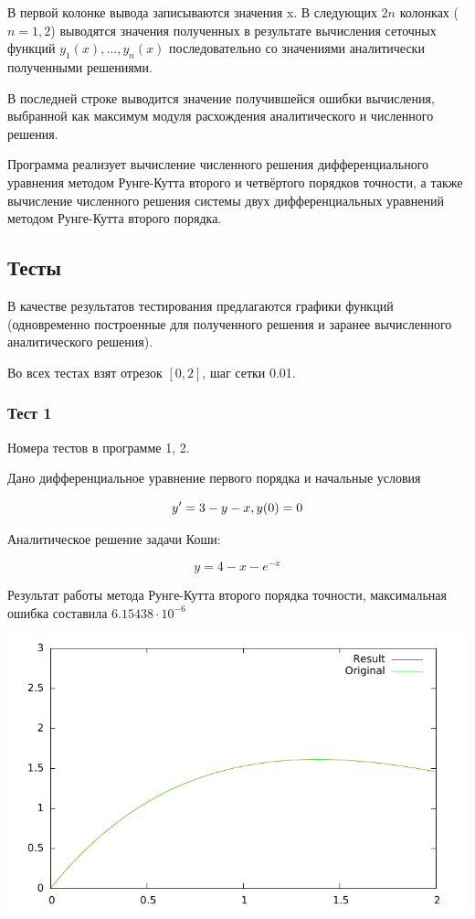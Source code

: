\documentclass[a4paper,11pt]{report}
\begin{document}
В первой колонке вывода записываются значения x. В следующих $2n$ колонках ($n = 1, 2$) выводятся значения полученных в результате вычисления
сеточных функций $y_1(x), ..., y_n(x)$ последовательно со значениями аналитически полученными решениями. 

В последней строке выводится значение получившейся ошибки вычисления, выбранной как максимум модуля расхождения аналитического и 
численного решения.

Программа реализует вычисление численного решения дифференциального уравнения методом Рунге-Кутта второго и четвёртого порядков
точности, а также вычисление численного решения системы двух дифференциальных уравнений методом Рунге-Кутта второго порядка.

\subsection*{Тесты}
В качестве результатов тестирования предлагаются графики функций (одновременно построенные для полученного решения и заранее 
вычисленного аналитического решения).

Во всех тестах взят отрезок $[0,2]$, шаг сетки 0.01.

\subsubsection{Тест 1}
Номера тестов в программе 1, 2.

Дано дифференциальное уравнение первого порядка и начальные условия

$$
y' = 3 - y - x, \\
y(0) = 0
$$

Аналитическое решение задачи Коши:

$$
y = 4 - x - e^{-x}
$$

Результат работы метода Рунге-Кутта второго порядка точности, 
максимальная ошибка составила $6.15438 \cdot 10^{-6}$


\includegraphics{../plots/test1_rk2.pdf}
\end{document}
